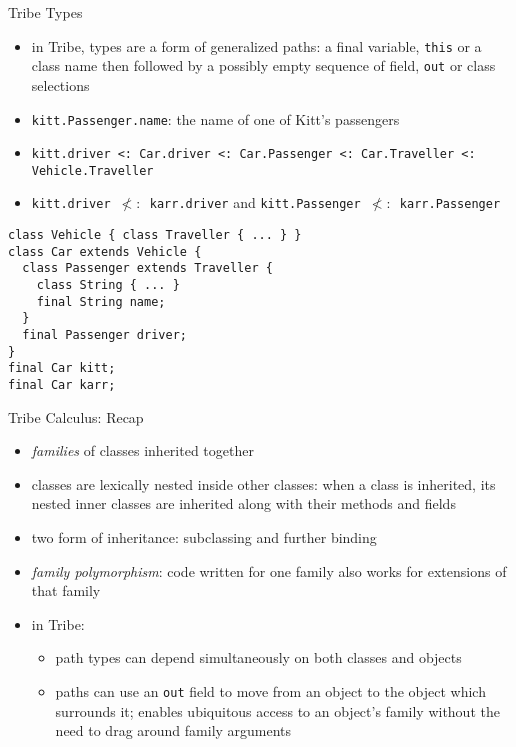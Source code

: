 \documentclass{beamer}
\begin{document}
\begin{frame}[fragile]{Tribe Types}
\begin{itemize}
\item in Tribe, types are a form of generalized paths: a final
  variable, {\tt this} or a class name then followed by a possibly
  empty sequence of field, {\tt out} or class selections
\item {\tt kitt.Passenger.name}: the name of one of Kitt's passengers
\item {\tt kitt.driver <: Car.driver <: Car.Passenger <: Car.Traveller <:
  Vehicle.Traveller}
\item {\tt kitt.driver $\not<:$ karr.driver} and {\tt kitt.Passenger $\not<:$ karr.Passenger}
\end{itemize}
\begin{verbatim}
class Vehicle { class Traveller { ... } }
class Car extends Vehicle {
  class Passenger extends Traveller {
    class String { ... }
    final String name;
  }
  final Passenger driver;
}
final Car kitt;
final Car karr;
\end{verbatim}
\end{frame}

\begin{frame}{Tribe Calculus: Recap}
\begin{itemize}
\item {\it families} of classes inherited together
\item classes are lexically nested inside other classes: when a class
  is inherited, its nested inner classes are inherited along with
  their methods and fields
\item two form of inheritance: subclassing and further binding
\item {\it family polymorphism}: code written for one family
  also works for extensions of that family
\item in Tribe:\begin{itemize}
\item path types can depend simultaneously on both classes and objects
\item paths can use an {\tt out} field to move from an object to the
  object which surrounds it; enables ubiquitous access to an object's
  family without the need to drag around family arguments
\end{itemize}
\end{itemize}
\end{frame}
\end{document}
